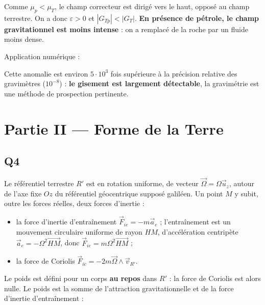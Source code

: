 \documentclass[11pt,a4paper]{article}
\providecommand{\tightlist}{\setlength{\itemsep}{0pt}\setlength{\parskip}{0pt}}
\newcommand{\equationajustee}[1]{%
  \sbox{\boiteequation}{$\displaystyle #1$}%
  \ifdim\wd\boiteequation>\linewidth
    \[\resizebox{\linewidth}{!}{\usebox{\boiteequation}}\]%
  \else
    \[#1\]%
  \fi}
\begin{document}
\equationajustee{\boxed{\varepsilon=\left(1-\frac{\mu_p}{\mu_T}\right)\left(\frac{r'}{d}\right)^2\frac{r'}{R_T}}}

Comme \(\mu_p<\mu_T\), le champ correcteur est dirigé vers le haut, opposé au champ terrestre. On a donc \(\varepsilon>0\) et \(|G_{Tp}|<|G_T|\). \textbf{En présence de pétrole, le champ gravitationnel est moins intense} : on a remplacé de la roche par un fluide moins dense.

Application numérique :

\equationajustee{\begin{aligned}
\varepsilon&=\frac56\times\frac14\times\frac{10^{-3}}{4}\\
&=5{,}2\cdot10^{-5}\\
&\approx\boxed{5\cdot10^{-5}}
\end{aligned}}

Cette anomalie est environ \(5\cdot10^{3}\) fois supérieure à la précision relative des gravimètres (\(10^{-8}\)) : \textbf{le gisement est largement détectable}, la gravimétrie est une méthode de prospection pertinente.

\hypertarget{partie-ii-forme-de-la-terre}{%
\section{Partie II --- Forme de la Terre}\label{partie-ii-forme-de-la-terre}}

\hypertarget{q4}{%
\subsection{Q4}\label{q4}}

Le référentiel terrestre \(R'\) est en rotation uniforme, de vecteur \(\vec\Omega=\Omega\vec u_z\), autour de l'axe fixe \(Oz\) du référentiel géocentrique supposé galiléen. Un point \(M\) y subit, outre les forces réelles, deux forces d'inertie :

\begin{itemize}
\tightlist
\item
  la force d'inertie d'entraînement \(\vec F_{ie}=-m\vec a_e\) ; l'entraînement est un mouvement circulaire uniforme de rayon \(HM\), d'accélération centripète \(\vec a_e=-\Omega^2\overrightarrow{HM}\), donc \(\vec F_{ie}=m\Omega^2\overrightarrow{HM}\) ;
\item
  la force de Coriolis \(\vec F_{ic}=-2m\vec\Omega\wedge\vec v_{R'}\).
\end{itemize}

Le poids est défini pour un corps \textbf{au repos} dans \(R'\) : la force de Coriolis est alors nulle. Le poids est la somme de l'attraction gravitationnelle et de la force d'inertie d'entraînement :
\end{document}
